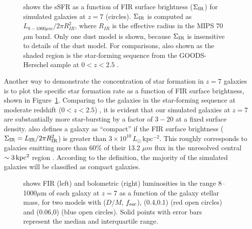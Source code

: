 \begin{figure}[!h]
\centering
\vskip -0cm
\hskip -0cm
\caption{%
shows the sSFR as a function of FIR surface brightness ($\Sigma_{\rm IR}$) 
for simulated galaxies at $z=7$ (circles).
$\Sigma_{\rm IR}$ is computed as $L_{8-1000\mu m} / 2\pi R_{IR}^2$, where $R_{IR}$ is the effective radius in the MIPS 70 $\mu$m band.
Only one dust model is shown, because $\Sigma_{\rm IR}$ is insensitive to details of the dust model.
For comparisons, also shown as the shaded region is the star-forming sequence from the GOODS-Herschel sample 
at $0<z<2.5$ \citep[][]{2011Elbaz}.
}
\label{fig:ssfr_SIR}
\end{figure}





Another way to demonstrate the concentration of star formation in $z=7$ galaxies
is to plot the specific star formation rate as a function of FIR surface brightness,
shown in  Figure~\ref{fig:ssfr_SIR}. Comparing to the galaxies in the star-forming sequence 
at moderate redshift ($0<z<2.5$) \citep[][]{2011Elbaz},
it is evident that our simulated galaxies at $z=7$ 
are substantially more star-bursting by a factor of $3-20$ at a 
fixed surface density. 
\citet{2011Elbaz} also defines a galaxy as ``compact'' if
the FIR surface brightness ($\Sigma_{\rm IR}=L_{\rm IR}/2\pi R_{\rm IR}^2$) is 
greater than $3\times10^{10}\,L_{\odot}\,$kpc$^{-2}$. This roughly corresponds 
to galaxies emitting more than 60\% of their 13.2 $\mu m$ flux in the unresolved 
central $\sim 3\,{\rm kpc^2}$ region \citep[see][]{2010DiazSantos}.
According to the definition, the majority of the simulated galaxies will be classified as compact galaxies.

\begin{figure}[!ht]
\centering
\vskip -0cm
\hskip -1cm
\hskip -0cm
\vskip -0cm
\caption{%
shows FIR (left) and bolometric (right) luminosities in the range 8--1000$\mu$m of each galaxy at $z=7$ 
as a function of the galaxy stellar mass,
for two models with ($D/M$, $f_{\rm esc}$), (0.4,0.1) (red open circles) and (0.06,0) (blue open circles).
Solid points with error bars represent the median and interquartile range.
}
\label{fig:Mstar_IR}
\end{figure}


